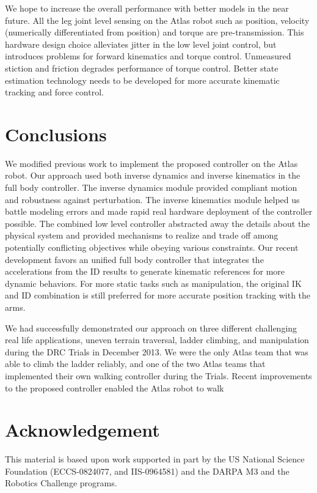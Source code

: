 \documentclass{ws-ijhr}
\begin{document}
We hope to increase the overall performance with better models in the near future. 
All the leg joint level sensing on the Atlas robot such as position, velocity 
(numerically differentiated from position) and torque are pre-transmission. 
This hardware design choice alleviates jitter in the low level joint control, 
but introduces problems for forward kinematics and torque control. 
Unmeasured stiction and friction degrades performance of torque control. 
Better state estimation technology needs to be developed for more accurate 
kinematic tracking and force control. 



\section{Conclusions}
\label{sec:conclusion}
We modified previous work to implement the proposed controller on the Atlas 
robot. 
Our approach used both inverse dynamics and inverse kinematics in the full body 
controller. 
The inverse dynamics module provided compliant motion and robustness against 
perturbation. 
The inverse kinematics module helped us battle modeling errors and made rapid 
real hardware deployment of the controller possible.
The combined low level controller abstracted away the details about the physical 
system and provided mechanisms to realize and trade off among potentially 
conflicting objectives while obeying various constraints. 
Our recent development favors an unified full body controller that integrates 
the accelerations from the ID results to generate kinematic references for more 
dynamic behaviors. 
For more static tasks such as manipulation, the original IK and ID combination 
is still preferred for more accurate position tracking with the arms.

We had successfully demonstrated our approach on three different challenging 
real life applications, uneven terrain traversal, ladder climbing, and 
manipulation during the DRC Trials in December 2013. 
We were the only Atlas team that was able to climb the ladder reliably, and one 
of the two Atlas teams that implemented their own walking controller during the
Trials. 
Recent improvements to the proposed controller enabled the Atlas robot to walk 
 

\section*{Acknowledgement}
This material is based upon work supported in part by the US National Science 
Foundation (ECCS-0824077, and IIS-0964581) and the DARPA M3 and the Robotics 
Challenge programs.
 



\end{document}
